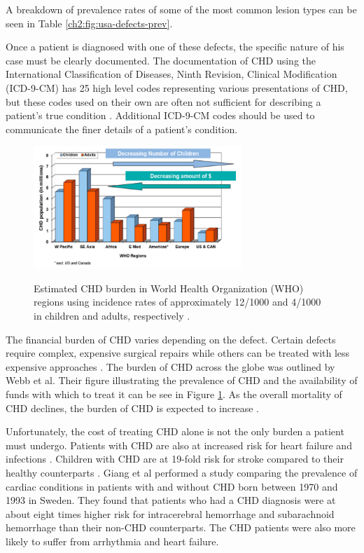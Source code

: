 A breakdown of prevalence rates of some of the most common lesion types can be seen in Table \ref{ch2:fig:usa-defects-prev}.

Once a patient is diagnosed with one of these defects, the specific nature of his case must be clearly documented. The documentation of CHD using the International Classification of Diseases, Ninth Revision, Clinical Modification (ICD-9-CM) has 25 high level codes representing various presentations of CHD, but these codes used on their own are often not sufficient for describing a patient's true condition \cite{Mozaffarian2016}. Additional ICD-9-CM codes should be used to communicate the finer details of a patient's condition. 

\begin{figure}
\centering
\includegraphics[width=0.7\textwidth]{2/CHD-burden-webb.png}
\label{ch2:fig:CHD-burden}
\caption{Estimated CHD burden in World Health Organization (WHO) regions using incidence rates of approximately 12/1000 and 4/1000 in children and adults, respectively \cite{Webb2015}.}
\end{figure}

The financial burden of CHD varies depending on the defect. Certain defects require complex, expensive surgical repairs while others can be treated with less expensive approaches \cite{Mozaffarian2016}. The burden of CHD across the globe was outlined by Webb et al. Their figure illustrating the prevalence of CHD and the availability of funds with which to treat it can be see in Figure \ref{ch2:fig:CHD-burden}. As the overall mortality of CHD declines, the burden of CHD is expected to increase \cite{Mozaffarian2016}.

Unfortunately, the cost of treating CHD alone is not the only burden a patient must undergo. Patients with CHD are also at increased risk for heart failure and infections \cite{Mozaffarian2016}. Children with CHD are at 19-fold risk for stroke compared to their healthy counterparts \cite{Fox2015}. Giang et al performed a study comparing the prevalence of cardiac conditions in patients with and without CHD born between 1970 and 1993 in Sweden. They found that patients who had a CHD diagnosis were at about eight times higher risk for intracerebral hemorrhage and subarachnoid hemorrhage than their non-CHD counterparts. The CHD patients were also more likely to suffer from arrhythmia and heart failure.

